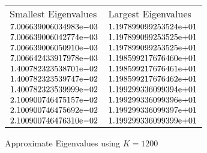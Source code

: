\begin{enumerate}
\begin{figure}[tbh]
 \centering    
\begin{tabular}{ ||p{6cm}||p{6cm}|}
\hline
 Smallest Eigenvalues & Largest Eigenvalues \\ \hhline{|=|=|}   
\hline
${7.006639006034983}\mathrm{e}{-03}$ & ${1.197899099253524}\mathrm{e}{+01}$ \\  
${7.006639006042774}\mathrm{e}{-03}$ & ${1.197899099253525}\mathrm{e}{+01}$ \\  
${7.006639006050910}\mathrm{e}{-03}$ & ${1.197899099253525}\mathrm{e}{+01}$ \\  
${7.006642433917978}\mathrm{e}{-03}$ & ${1.198599217676460}\mathrm{e}{+01}$ \\  
${1.400782323538701}\mathrm{e}{-02}$ & ${1.198599217676461}\mathrm{e}{+01}$ \\  
${1.400782323539747}\mathrm{e}{-02}$ & ${1.198599217676462}\mathrm{e}{+01}$ \\  
${1.400782323539999}\mathrm{e}{-02}$ & ${1.199299336099394}\mathrm{e}{+01}$ \\  
${2.100900746475157}\mathrm{e}{-02}$ & ${1.199299336099396}\mathrm{e}{+01}$ \\  
${2.100900746475692}\mathrm{e}{-02}$ & ${1.199299336099397}\mathrm{e}{+01}$ \\  
${2.100900746476310}\mathrm{e}{-02}$ & ${1.199299336099399}\mathrm{e}{+01}$ \\  
\hline  
\end{tabular} 
\caption{Approximate Eigenvalues using $K = 1200$}
   \label{tab:app_eig_1200}
\end{figure} 


\end{enumerate}
